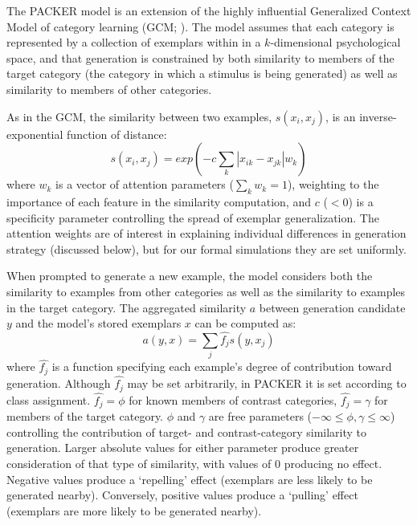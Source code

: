 \documentclass[10pt,letterpaper]{article}
\begin{document}
The PACKER model is an extension of the highly influential Generalized Context Model of category learning (GCM; \citealp{nosofsky1984choice}). The model assumes that each category is represented by a collection of exemplars within in a $k$-dimensional psychological space, and that generation is constrained by both similarity to members of the target category (the category in which a stimulus is being generated) as well as similarity to members of other categories. 

As in the GCM, the similarity between two examples, $s(x_i, x_j)$, is an inverse-exponential function of distance:
\begin{equation}
  s(x_i,x_j) = exp( -c \sum_{k}{|x_{ik} - x_{jk}|}w_k )
  \label{eq:similarity}
\end{equation}
where $w_k$ is a vector of attention parameters ($\sum_k{w_k} = 1$), weighting to the importance of each feature in the similarity computation, and $c$ ($<0$) is a specificity parameter controlling the spread of exemplar generalization. The attention weights are of interest in explaining individual differences in generation strategy (discussed below), but for our formal simulations they are set uniformly.

When prompted to generate a new example, the model considers both the similarity to examples from other categories as well as the similarity to examples in the target category. The aggregated similarity $a$ between generation candidate $y$ and the model's stored exemplars $x$ can be computed as:
\begin{equation}
  a(y, x) = \sum_j{\hat{f_j} s(y, x_j)}
  \label{eq:packer-ss}
\end{equation}
where $\hat{f_j}$ is a function specifying each example's degree of contribution toward generation. Although $\hat{f_j}$ may be set arbitrarily, in PACKER it is set according to class assignment. $\hat{f_j} = \phi$ for known members of contrast categories, $\hat{f_j} = \gamma$ for members of the target category. $\phi$ and $\gamma$ are free parameters ($-\infty \leq \phi, \gamma \leq \infty$) controlling the contribution of target- and contrast-category similarity to generation. Larger absolute values for either parameter produce greater consideration of that type of similarity, with values of 0 producing no effect. Negative values produce a `repelling' effect (exemplars are less likely to be generated nearby). Conversely, positive values produce a `pulling' effect (exemplars are more likely to be generated nearby). 
\end{document}
